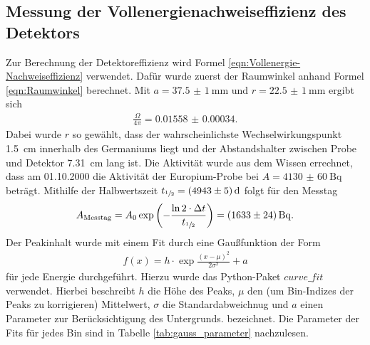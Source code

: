 \subsection{Messung der Vollenergienachweiseffizienz des Detektors}
\label{sec:Effizienzmessung}

Zur Berechnung der Detektoreffizienz wird Formel
\eqref{eqn:Vollenergie-Nachweiseffizienz} verwendet. Dafür wurde zuerst der
Raumwinkel anhand Formel \eqref{eqn:Raumwinkel} berechnet. Mit
$a = \SI{37.5(10)}{\milli\meter}$ und $r = \SI{22.5(10)}{\milli\meter}$ ergibt sich
\begin{align*}
  \frac{\Omega}{4\pi} = \num{0.01558(34)}.
\end{align*}
Dabei wurde $r$ so gewählt, dass der wahrscheinlichste Wechselwirkungspunkt
\SI{1.5}{\centi\meter} innerhalb des Germaniums liegt und der Abstandshalter
zwischen Probe und Detektor \SI{7.31}{\centi\meter} lang ist.
Die Aktivität wurde aus dem Wissen errechnet, dass am 01.10.2000 die Aktivität
der Europium-Probe bei $A = \SI{4130(60)}{\becquerel}$ beträgt. Mithilfe der
Halbwertszeit $t_{\sfrac{1}{2}} = \SI{4943(5)}{\day}$ folgt für den Messtag
\begin{align*}
	A_\text{Messtag} = A_0 \exp\left(-\frac{\ln{2} \cdot\Delta t}{t_{\sfrac{1}{2}}}\right)=\SI{1633(24)}{\becquerel}
	.
\end{align*}
Der Peakinhalt wurde mit einem Fit durch eine Gaußfunktion der Form
\begin{align*}
	f\left(x\right) = h\cdot \exp{\frac{(x-\mu)^2}{2\sigma^2}} + a
\end{align*}
für jede Energie durchgeführt. Hierzu wurde das Python-Paket $\textit{curve\_fit}$
verwendet. Hierbei beschreibt $h$ die Höhe des Peaks, $\mu$
den (um Bin-Indizes der Peaks zu korrigieren) Mittelwert, $\sigma$ die
Standardabweichnug und $a$ einen Parameter zur Berücksichtigung des Untergrunds.
bezeichnet. Die Parameter der Fits für jedes Bin sind in Tabelle
\ref{tab:gauss_parameter} nachzulesen.


